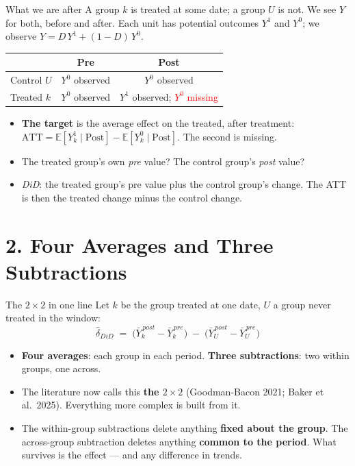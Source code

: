 \documentclass[
  11pt,
  ignorenonframetext,
  aspectratio=169,
]{beamer}
\providecommand{\tightlist}{%
  \setlength{\itemsep}{0pt}\setlength{\parskip}{0pt}}
\begin{document}
\begin{frame}{What we are after}
\protect{}\label{what-we-are-after}
A group \(k\) is treated at some date; a group \(U\) is not. We see
\(Y\) for both, before and after. Each unit has potential outcomes
\(Y^1\) and \(Y^0\); we observe \(Y = D\,Y^1 + (1-D)\,Y^0\).

\begin{center}\small
\begin{tabular}{lcc}
\toprule
 & Pre & Post \\
\midrule
Control $U$ & $Y^0$ observed & $Y^0$ observed \\
Treated $k$ & $Y^0$ observed & $Y^1$ observed; \;\textcolor{red}{$Y^0$ missing} \\
\bottomrule
\end{tabular}
\end{center}

\begin{itemize}
\tightlist
\item
  \textbf{The target} is the average effect on the treated, after
  treatment:
  \(\text{ATT} = \mathbb{E}[Y^1_k \mid \text{Post}] - \mathbb{E}[Y^0_k \mid \text{Post}]\).
  The second is missing.
\item
  The treated group's own \emph{pre} value? The control group's
  \emph{post} value?
\item
  \emph{DiD}: the treated group's pre value plus the control group's
  change. The ATT is then the treated change minus the control change.
\end{itemize}
\end{frame}

\section{2. Four Averages and Three
Subtractions}\label{four-averages-and-three-subtractions}

\begin{frame}{The \(2 \times 2\) in one line}
\protect{}\label{the-2-times-2-in-one-line}
Let \(k\) be the group treated at one date, \(U\) a group never treated
in the window: \[
\hat\delta_{DiD} \;=\; \big(\bar Y_k^{\,post} - \bar Y_k^{\,pre}\big) \;-\; \big(\bar Y_U^{\,post} - \bar Y_U^{\,pre}\big)
\]

\begin{itemize}
\tightlist
\item
  \textbf{Four averages}: each group in each period. \textbf{Three
  subtractions}: two within groups, one across.
\item
  The literature now calls this \textbf{the \(2 \times 2\)}
  (Goodman-Bacon 2021; Baker et al.~2025). Everything more complex is
  built from it.
\item
  The within-group subtractions delete anything \textbf{fixed about the
  group}. The across-group subtraction deletes anything \textbf{common
  to the period}. What survives is the effect --- and any difference in
  trends.
\end{itemize}
\end{frame}
\end{document}
